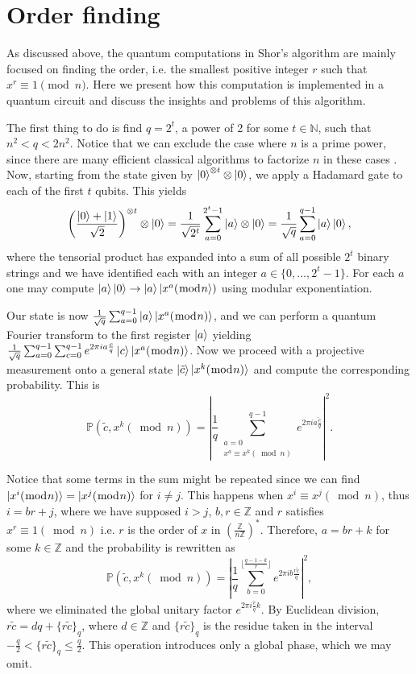 \documentclass[aps,prl,twocolumn,superscriptaddress,groupedaddress]{revtex4}  %
\begin{document}
\section{Order finding}\label{sec:Orderfinding}

As discussed above, the quantum computations in Shor's algorithm are mainly focused on finding the order, i.e. the smallest positive integer $r$ such that $x^r\equiv 1 \pmod n$. Here we present how this computation is implemented in a quantum circuit and discuss the insights and problems of this algorithm.

 The first thing to do is find $q=2^t$, a power of 2 for some $t\in \mathbb{N}$, such that $n^2<q<2n^2$. Notice that we can exclude the case where $n$ is a prime power, since there are many efficient classical algorithms to factorize $n$ in these cases \cite{Bernstein98,AgrawalKayalSaxena04}.
Now, starting from the state given by $\ket{0}^{\otimes t}\otimes\ket{0}$,
we apply a Hadamard gate to each of the first $t$ qubits. This yields
\[\left(\frac{\ket{0}+\ket{1}}{\sqrt{2}}\right)^{\otimes t}\otimes\ket{0}=\frac{1}{\sqrt{2^t}}\sum_{a=0}^{2^t-1}\ket{a}\otimes\ket{0}=\frac{1}{\sqrt{q}}\sum_{a=0}^{q-1}\ket{a}\ket{0},\]
where the tensorial product has expanded into a sum of all possible $2^t$ binary strings and we have identified each with an integer $a\in\{0,\dots,2^t-1\}$. For each $a$ one may compute $\ket{a}\ket{0}\rightarrow \ket{a}\ket{x^a(\bmod{n}})$ using modular exponentiation.

Our state is now 
$\frac{1}{\sqrt{q}}\sum_{a=0}^{q-1}\ket{a}\ket{x^a(\bmod{n})}$, and we can perform a quantum Fourier transform to the first register $\ket{a}$ yielding 
$\frac{1}{\sqrt{q}}\sum_{a=0}^{q-1}\sum_{c=0}^{q-1}e^{2\pi ia\frac{c}{q}}\ket{c}\ket{x^a(\bmod{n})}$.
Now we proceed with a projective measurement onto a general state $\ket{\tilde{c}}\ket{x^k(\bmod{n})}$ and compute the corresponding probability. This is
\[\mathbb{P}(\tilde{c},x^k(\bmod{n}))=\left|\frac{1}{q}\sum_{\substack{a=0\\x^a\equiv x^k (\bmod{n})}}^{q-1}e^{2\pi i a \frac{\tilde{c}}{q}}\right|^2.\]



Notice that some terms in the sum might be repeated since we can find $\ket{x^i(\bmod{n})}=\ket{x^j(\bmod{n})}$ for $i\neq j$. This happens when $x^ i\equiv x^j(\bmod{n})$, thus $i=br+j$, where we have supposed $i>j$, $b,r\in \mathbb{Z}$ and $r$ satisfies $x^r\equiv 1(\bmod{n})$ i.e. $r$ is the order of $x$ in $\left(\frac{\mathbb{Z}}{n\mathbb{Z}}\right)^*$. Therefore, $a=br+k$ for some $k\in \mathbb{Z}$ and the probability is rewritten as
\[\mathbb{P}(\tilde{c},x^k(\bmod{n}))=\left|\frac{1}{q}\sum_{b=0}^{\lfloor\frac{q-1-k}{r}\rfloor}e^{2\pi i b\frac{r\tilde{c}}{q}}\right|^2,\]
where we eliminated the global unitary factor $e^{2\pi i \frac{\tilde{c}}{q}k}$.
By Euclidean division, $r\tilde{c}=dq+\{r\tilde{c}\}_q$, where $d\in \mathbb{Z}$ and $\{r\tilde{c}\}_q$ is the residue taken in the interval $-\frac{q}{2}<\{r\tilde{c}\}_q\le\frac{q}{2}$. This operation introduces only a global phase, which we may omit.
\end{document}
